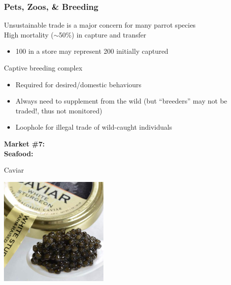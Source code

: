 \documentclass[10pt]{beamer}
\begin{document}
\begin{frame}[t]
\frametitle{Pets, Zoos, \& Breeding}
\vspace{0.5cm}

	Unsustainable trade is a major concern for many parrot species\\
	
	\vspace{0.5cm}
	High mortality ($\sim$50\%) in capture and transfer 
		\begin{itemize}
			\item 100 in a store may represent 200 initially captured
		\end{itemize}
	
	\vspace{0.5cm}
	Captive breeding complex
		\begin{itemize}
			\item Required for desired/domestic behaviours
			\item Always need to supplement from the wild (but ``breeders'' may not be traded!, thus not monitored)
			\item Loophole for illegal trade of wild-caught individuals
		\end{itemize}	
\end{frame}	


\begin{frame}
	\begin{center}
		\Large{\textbf{\textcolor{myblue}{Market \#7:\\ Seafood:}}}\normalsize{}\\ 
		
		\vspace{0.25cm}
		
		Caviar\\
		
		\vspace{0.5cm}
		
		\includegraphics[width=0.4\textwidth]{figures/caviar.jpg}
	\end{center}
\end{frame}
\end{document}
